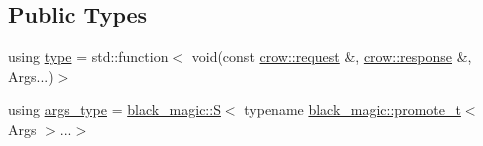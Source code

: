 \subsection*{Public Types}
\begin{DoxyCompactItemize}
\item 
using \hyperlink{structcrow_1_1detail_1_1routing__handler__call__helper_1_1_wrapped_1_1handler__type__helper_3_01506e35faa94646c63b5476ce8ce1df0a_a904d9c36f422d22baad0484a878c0e06}{type} = std\-::function$<$ void(const \hyperlink{structcrow_1_1request}{crow\-::request} \&, \hyperlink{structcrow_1_1response}{crow\-::response} \&, Args...)$>$
\item 
using \hyperlink{structcrow_1_1detail_1_1routing__handler__call__helper_1_1_wrapped_1_1handler__type__helper_3_01506e35faa94646c63b5476ce8ce1df0a_aaa4436441afecb2e2637323f9feb57d6}{args\-\_\-type} = \hyperlink{structcrow_1_1black__magic_1_1_s}{black\-\_\-magic\-::\-S}$<$ typename \hyperlink{namespacecrow_1_1black__magic_a4964540ce915507f5167e1a96f801c71}{black\-\_\-magic\-::promote\-\_\-t}$<$ Args $>$...$>$
\end{DoxyCompactItemize}


